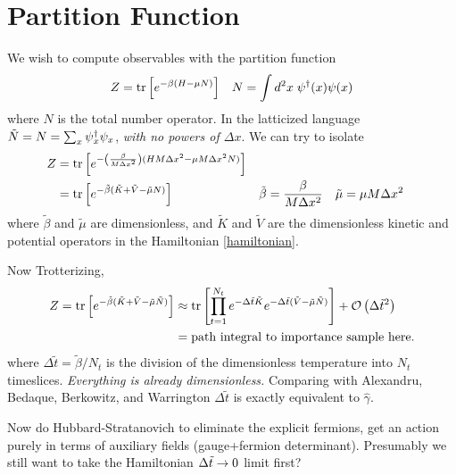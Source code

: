 \section{Partition Function}

We wish to compute observables with the partition function
\begin{align}
	Z
	&=
	\text{tr}\left[e^{-\beta(H-\mu N)}\right]
	&
	N = \int d^2x\; \psi{}^{\dagger}(x)\psi(x)
\end{align}
where $N$ is the total number operator.
In the latticized language $\tilde{N}=N=\sum_x \psi{}^{\dagger}_x \psi_x$, \emph{with no powers of $\Delta x$}.
We can try to isolate
\begin{align}
	Z
	&=
	\text{tr}\left[e^{-\left(\frac{\beta}{M\Delta x^2}\right)(HM\Delta x^2 -\mu M \Delta x^2 N)}\right]
\\
	&=
	\text{tr}\left[e^{-\tilde{\beta}(\tilde{K}+\tilde{V}-\tilde{\mu} N)}\right]
	&
	\tilde{\beta} &= \frac{\beta}{M \Delta x^2}
	&
	\tilde{\mu}   &= \mu M \Delta x^2
\end{align}
where $\tilde{\beta}$ and $\tilde{\mu}$ are dimensionless, and $\tilde{K}$ and $\tilde{V}$ are the dimensionless kinetic and potential operators in the Hamiltonian \eqref{hamiltonian}.

Now Trotterizing,
\begin{align}
	Z
	=
	\text{tr}\left[e^{-\tilde{\beta}(\tilde{K}+\tilde{V}-\tilde{\mu} \tilde{N})}\right]
	&\approx
	\text{tr}\left[\prod_{t=1}^{N_t} e^{-\Delta \tilde{t} \tilde{K}} e^{-\Delta\tilde{t}(\tilde{V}-\tilde{\mu}\tilde{N})}\right] + \mathcal{O}\left(\Delta\tilde{t}^2\right)
	\\
	&=
	\textrm{path integral to importance sample here.}
\end{align}
where $\Delta\tilde{t} = \tilde{\beta}/N_t$ is the division of the dimensionless temperature into $N_t$ timeslices.
\emph{Everything is already dimensionless.}
Comparing with Alexandru, Bedaque, Berkowitz, and Warrington $\Delta\tilde{t}$ is exactly equivalent to $\hat{\gamma}$.

Now do Hubbard-Stratanovich to eliminate the explicit fermions, get an action purely in terms of auxiliary fields (gauge+fermion determinant).
Presumably we still want to take the Hamiltonian $\Delta\tilde{t}\rightarrow0$ limit first?
